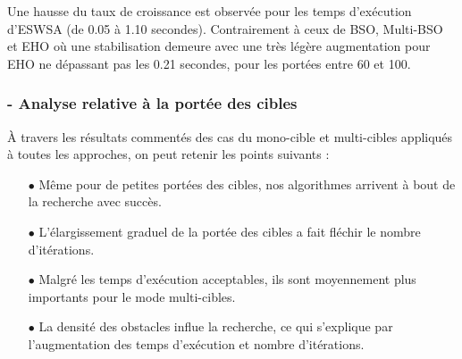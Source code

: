 	Une hausse du taux de croissance est observée pour les temps d'exécution d'ESWSA (de 0.05 à 1.10 secondes). Contrairement à ceux de BSO, Multi-BSO et EHO où une stabilisation demeure avec une très légère augmentation pour EHO ne dépassant pas les 0.21 secondes, pour les portées entre 60 et 100.
	
	
	
	\noindent
	\hspace{-0.5cm}
	\begin{minipage}[t]{0.55\textwidth}
		\captionsetup{width=0.8\linewidth}
		\centering{}
		\label{IP5c}
	\end{minipage}\hfill
	\hspace{-0.5cm}
	\begin{minipage}[t]{0.55\textwidth}
		\captionsetup{width=0.8\linewidth}
		\centering{}
		\label{tP5c}
	\end{minipage}\hfill
	
	
	\subsubsection{- Analyse relative à la portée des cibles}
	
	À travers les résultats commentés des cas du mono-cible et multi-cibles appliqués à toutes les approches, on peut retenir les points suivants :
	
	\begin{itemize}
		\item[$\bullet$] Même pour de petites portées des cibles, nos algorithmes arrivent à bout de la recherche avec succès.
		
		\item[$\bullet$] L'élargissement graduel de la portée des cibles a fait fléchir le nombre d'itérations.
		
		\item[$\bullet$] Malgré les temps d'exécution acceptables, ils sont moyennement plus importants pour le mode multi-cibles.
		
		\item[$\bullet$] La densité des obstacles influe la recherche, ce qui s'explique par l'augmentation des temps d'exécution et nombre d'itérations.\\
	\end{itemize}
	
